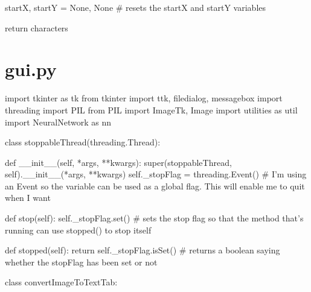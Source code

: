 \documentclass{report}
\begin{document}
\begin{python}
        startX, startY = None, None  # resets the startX and startY variables

    return characters
\end{python}
\newpage
\section{gui.py}
\begin{python}
import tkinter as tk
from tkinter import ttk, filedialog, messagebox
import threading
import PIL
from PIL import ImageTk, Image
import utilities as util
import NeuralNetwork as nn

class stoppableThread(threading.Thread):

    def __init__(self, *args, **kwargs):
        super(stoppableThread, self).__init__(*args, **kwargs)
        self._stopFlag = threading.Event()  # I'm using an Event so the variable can be used as a global flag. This will enable me to quit when I want

    def stop(self):
        self._stopFlag.set()  # sets the stop flag so that the method that's running can use stopped() to stop itself

    def stopped(self):
        return self._stopFlag.isSet()  # returns a boolean saying whether the stopFlag has been set or not


class convertImageToTextTab:


\end{python}
\end{document}
